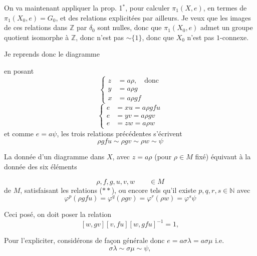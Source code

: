 
On va maintenant appliquer la prop. 1$^{*}$, pour calculer $\pi_1(X,e)$, en termes de $\pi_1(X_0,e)=G_0$, et des relations explicitées par ailleurs. Je veux   que les images de ces relations dans $\mathbb Z$ par $\delta_0$ sont nulles, donc que $\pi_1(X_0,e)$ admet un groupe quotient isomorphe à $\mathbb Z$, donc n'est pas $\sim\{1\}$, donc que $X_0$ n'est pas $1$-connexe.

Je reprends donc le diagramme

en posant
\[
\left\{\begin{aligned}z&=a\rho,\quad\text{donc}\\ y&=a\rho g\\ x&=a\rho gf\end{aligned}\right.
\]
\[
\left\{\begin{aligned}e&=xu=a\rho gfu\\ e&=yv=a\rho gv\\ e&=zw=a\rho w\end{aligned}\right.
\]
et comme $e=a\psi$, les trois relations précédentes s'écrivent
\[
\tag*{(**)}\boxed{\rho gfu\sim\rho gv\sim\rho w\sim\psi}
\]

La donnée d'un diagramme  dans $X$, avec $z=a\rho$ (pour $\rho\in M$ fixé) équivaut à la donnée des six éléments


\[
\rho,f,g,u,v,w\qquad\in M
\]
de $M$, satisfaisant les relations ($**$), ou encore tels qu'il existe $p,q,r,s\in\mathbb N$ avec
\[
\boxed{\varphi^p(\rho gfu)=\varphi^q(\rho gv)=\varphi^r(\rho w)=\varphi^s\psi}
\]

Ceci posé, on doit poser la relation
\[
\boxed{[w,gv][v,fu][w,gfu]^{-1}=1},
\]

Pour l'expliciter, considérons de façon générale
donc $e=a\sigma\lambda=a\sigma\mu$ i.e.
\[
\boxed{\sigma\lambda\sim\sigma\mu\sim\psi},
\]

